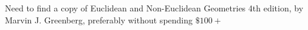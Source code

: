 \documentclass[12pt]{article}
\begin{document}



Need to find a copy of Euclidean and Non-Euclidean Geometries 4th edition, by Marvin J. Greenberg, preferably without spending $\$100+$
\end{document}
